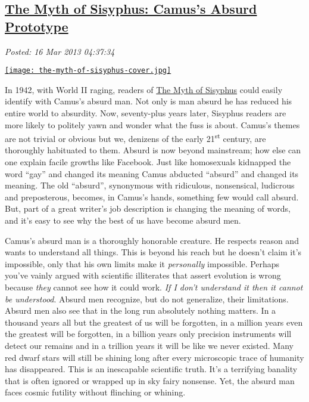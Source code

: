 %

\subsection*{\href{https://bakerjd99.wordpress.com/2013/03/15/the-myth-of-sisyphus-camuss-absurd-prototype/}{The Myth of Sisyphus: Camus's Absurd Prototype}}


\noindent\emph{Posted: 16 Mar 2013 04:37:34}
\vspace{6pt}

\captionsetup[floatingfigure]{labelformat=empty}

\begin{floatingfigure}[l]{0.24\textwidth}
\centering
\href{http://www.amazon.com/Myth-Sisyphus-Other-Essays/dp/0679733736}{\texttt{[image: the-myth-of-sisyphus-cover.jpg]}}
\label{fig:3844X0}
\end{floatingfigure} In 1942, with World II raging, readers of
\href{http://www.amazon.com/Myth-Sisyphus-Other-Essays/dp/0679733736}{The
Myth of Sisyphus} could easily identify with Camus's absurd man. Not
only is man absurd he has reduced his entire world to absurdity. Now,
seventy-plus years later, Sisyphus readers are more likely to politely
yawn and wonder what the fuss is about. Camus's themes are not trivial
or obvious but we, denizens of the early 21\textsuperscript{st} century,
are thoroughly habituated to them. Absurd is now beyond mainstream; how
else can one explain facile growths like Facebook. Just like homosexuals
kidnapped the word ``gay'' and changed its meaning Camus abducted
``absurd'' and changed its meaning. The old ``absurd'', synonymous with
ridiculous, nonsensical, ludicrous and preposterous, becomes, in Camus's
hands, something few would call absurd. But, part of a great writer's
job description is changing the meaning of words, and it's easy to see
why the best of us have become absurd men.

Camus's absurd man is a thoroughly honorable creature. He respects
reason and wants to understand all things. This is beyond his reach but
he doesn't claim it's impossible, only that his own limits make it
\emph{personally} impossible. Perhaps you've vainly argued with
scientific illiterates that assert evolution is wrong because
\emph{they} cannot see how it could work. \emph{If I don't understand it
then it cannot be understood}. Absurd men recognize, but do not
generalize, their limitations. Absurd men also see that in the long run
absolutely nothing matters. In a thousand years all but the greatest of
us will be forgotten, in a million years even the greatest will be
forgotten, in a billion years only precision instruments will detect our
remains and in a trillion years it will be like we never existed. Many
red dwarf stars will still be shining long after every microscopic trace
of humanity has disappeared. This is an inescapable scientific truth.
It's a terrifying banality that is often ignored or wrapped up in sky
fairy nonsense. Yet, the absurd man faces cosmic futility without
flinching or whining.

